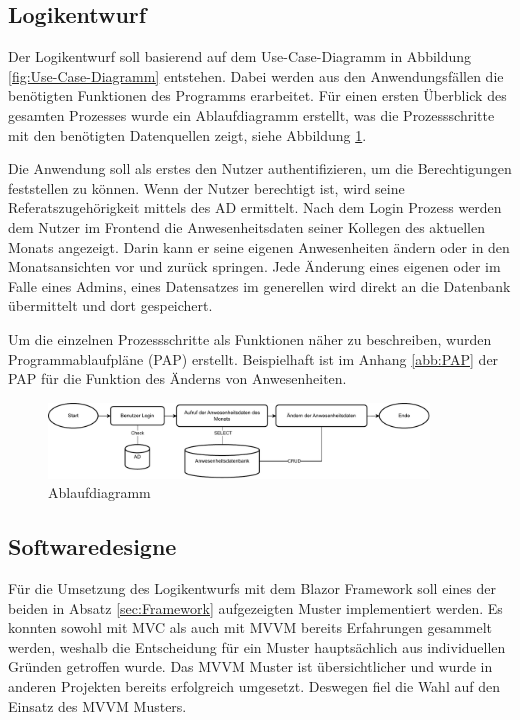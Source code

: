 
\subsection{Logikentwurf}
\label{sec:Logikentwurf}
Der Logikentwurf soll basierend auf dem Use-Case-Diagramm in Abbildung \ref{fig:Use-Case-Diagramm} entstehen. Dabei werden aus den Anwendungsfällen die benötigten Funktionen des Programms erarbeitet. Für einen ersten Überblick des gesamten Prozesses wurde ein Ablaufdiagramm erstellt, was die Prozessschritte mit den benötigten Datenquellen zeigt, siehe Abbildung \ref{abb:Flow}.

Die Anwendung soll als erstes den Nutzer authentifizieren, um die Berechtigungen feststellen zu können. Wenn der Nutzer berechtigt ist, wird seine Referatszugehörigkeit mittels des AD ermittelt. Nach dem Login Prozess werden dem Nutzer im Frontend die Anwesenheitsdaten seiner Kollegen des aktuellen Monats angezeigt. Darin kann er seine eigenen Anwesenheiten ändern oder in den Monatsansichten vor und zurück springen. Jede Änderung eines eigenen oder im Falle eines Admins, eines Datensatzes im generellen wird direkt an die Datenbank übermittelt und dort gespeichert.

Um die einzelnen Prozessschritte als Funktionen näher zu beschreiben, wurden Programmablaufpläne (PAP) erstellt. Beispielhaft ist im Anhang \ref{abb:PAP} der PAP für die Funktion des Änderns von Anwesenheiten.

\begin{figure}[htb]
    \centering
    \includegraphics[width=0.9\textwidth,angle=0]{abb/Flow-Diagramm.drawio.pdf}
    \caption[Ablaufdiagramm]{Ablaufdiagramm}
    \label{abb:Flow}
\end{figure}

\subsection{Softwaredesigne}
\label{sec:Softwaredesigne}
Für die Umsetzung des Logikentwurfs mit dem Blazor Framework soll eines der beiden in Absatz \ref{sec:Framework}  aufgezeigten Muster implementiert werden. Es konnten sowohl mit MVC als auch mit MVVM bereits Erfahrungen gesammelt werden, weshalb  die Entscheidung für ein Muster hauptsächlich aus individuellen Gründen getroffen wurde. Das MVVM Muster ist übersichtlicher und wurde in anderen Projekten bereits erfolgreich umgesetzt. Deswegen fiel die Wahl auf den Einsatz des MVVM Musters.

